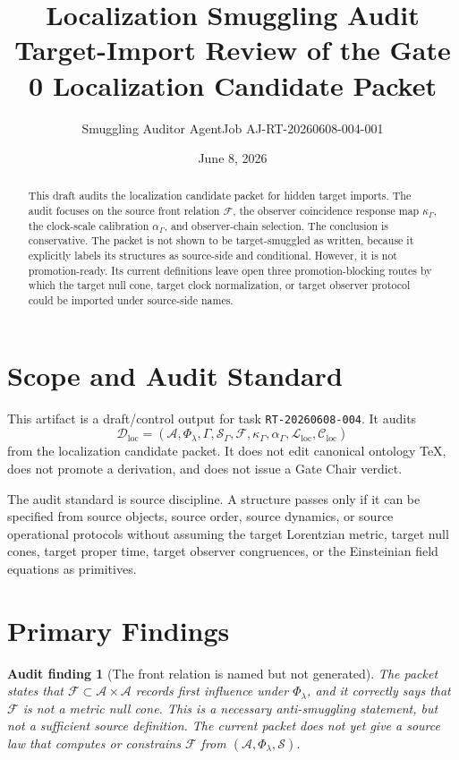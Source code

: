 \documentclass[11pt]{article}
\title{\textbf{Localization Smuggling Audit}\\[0.35em]
\large Target-Import Review of the Gate 0 Localization Candidate Packet}
\author{Smuggling Auditor AgentJob AJ-RT-20260608-004-001}
\date{June 8, 2026}
\newcommand{\Sub}{\mathcal{A}}
\newcommand{\PhiFlow}{\Phi_{\lambda}}
\newcommand{\Data}{\mathcal{D}_{\mathrm{loc}}}
\newcommand{\Map}{\mathcal{L}_{\mathrm{loc}}}
\newcommand{\Constraints}{\mathcal{C}_{\mathrm{loc}}}
\newcommand{\Front}{\mathcal{F}}
\newcommand{\Order}{\mathcal{S}}
\newtheorem{auditfinding}{Audit finding}
\begin{document}
\maketitle

\begin{abstract}
This draft audits the localization candidate packet for hidden target imports.
The audit focuses on the source front relation \(\Front\), the observer
coincidence response map \(\kappa_{\Gamma}\), the clock-scale calibration
\(\alpha_{\Gamma}\), and observer-chain selection. The conclusion is
conservative. The packet is not shown to be target-smuggled as written, because
it explicitly labels its structures as source-side and conditional. However,
it is not promotion-ready. Its current definitions leave open three
promotion-blocking routes by which the target null cone, target clock
normalization, or target observer protocol could be imported under source-side
names.
\end{abstract}

\section{Scope and Audit Standard}

This artifact is a draft/control output for task \texttt{RT-20260608-004}. It
audits
\[
\Data
=
(\Sub,\PhiFlow,\Gamma,\Order_{\Gamma},\Front,\kappa_{\Gamma},
\alpha_{\Gamma},\Map,\Constraints)
\]
from the localization candidate packet. It does not edit canonical ontology
TeX, does not promote a derivation, and does not issue a Gate Chair verdict.

The audit standard is source discipline. A structure passes only if it can be
specified from source objects, source order, source dynamics, or source
operational protocols without assuming the target Lorentzian metric, target
null cones, target proper time, target observer congruences, or the
Einsteinian field equations as primitives.

\section{Primary Findings}

\begin{auditfinding}[The front relation is named but not generated]
The packet states that \(\Front\subset\Sub\times\Sub\) records first influence
under \(\PhiFlow\), and it correctly says that \(\Front\) is not a metric null
cone. This is a necessary anti-smuggling statement, but not a sufficient
source definition. The current packet does not yet give a source law that
computes or constrains \(\Front\) from \((\Sub,\PhiFlow,\Order)\).
\end{auditfinding}
\end{document}
